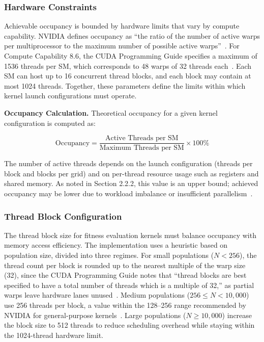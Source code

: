 \documentclass[a4paper,12pt]{article}
\begin{document}

  \subsubsection*{Hardware Constraints}

  Achievable occupancy is bounded by hardware limits that vary by compute capability. NVIDIA defines occupancy as ``the ratio of the number of active warps per multiprocessor to the maximum number of possible active warps''~\cite{nvidia2024cuda}. For Compute Capability 8.6, the CUDA Programming Guide specifies a maximum of 1536 threads per SM, which corresponds to 48 warps of 32 threads each~\cite{nvidia2024programming}. Each SM can host up to 16 concurrent thread blocks, and each block may contain at most 1024 threads. Together, these parameters define the limits within which kernel launch configurations must operate.

  \textbf{Occupancy Calculation.} Theoretical occupancy for a given kernel configuration is computed as:

  \begin{equation}
      \text{Occupancy} = \frac{\text{Active Threads per SM}}{\text{Maximum Threads per SM}} \times 100\%
  \end{equation}

  The number of active threads depends on the launch configuration (threads per block and blocks per grid) and on per-thread resource usage such as registers and shared memory. As noted in Section 2.2.2, this value is an upper bound; achieved occupancy may be lower due to workload imbalance or insufficient parallelism~\cite{nvidia2024occupancy}.

  \subsubsection*{Thread Block Configuration}

  The thread block size for fitness evaluation kernels must balance occupancy with memory access efficiency. The implementation uses a heuristic based on population size, divided into three regimes. For small populations ($N < 256$), the thread count per block is rounded up to the nearest multiple of the warp size (32), since the CUDA Programming Guide notes that ``thread blocks are best specified to have a total number of threads which is a multiple of 32,'' as partial warps leave hardware lanes unused~\cite{nvidia2025cudaguide}. Medium populations ($256 \leq N < 10{,}000$) use 256 threads per block, a value within the 128--256 range recommended by NVIDIA for general-purpose kernels~\cite{nvidia_occupancy}. Large populations ($N \geq 10{,}000$) increase the block size to 512 threads to reduce scheduling overhead while staying within the 1024-thread hardware limit.
\end{document}

